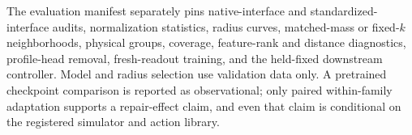 The evaluation manifest separately pins native-interface and standardized-interface audits,
normalization statistics, radius curves, matched-mass or fixed-$k$ neighborhoods, physical groups,
coverage, feature-rank and distance diagnostics, profile-head removal, fresh-readout training, and
the held-fixed downstream controller.  Model and radius selection use validation data only.  A
pretrained checkpoint comparison is reported as observational; only paired within-family adaptation
supports a repair-effect claim, and even that claim is conditional on the registered simulator and
action library.


\endgroup
